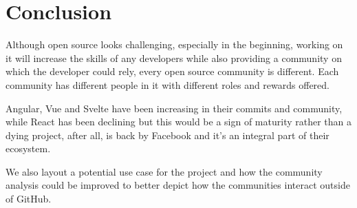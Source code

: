 \section{Conclusion}
Although open source looks challenging, especially in the beginning, working on it will increase the skills of any developers while also providing a community on which the developer could rely, every open source community is different. Each community has different people in it with different roles and rewards offered. 

Angular, Vue and Svelte have been increasing in their commits and community, while React has been declining but this would be a sign of maturity rather than a dying project, after all, is back by Facebook and it's an integral part of their ecosystem.

We also layout a potential use case for the project and how the community analysis could be improved to better depict how the communities interact outside of GitHub.

